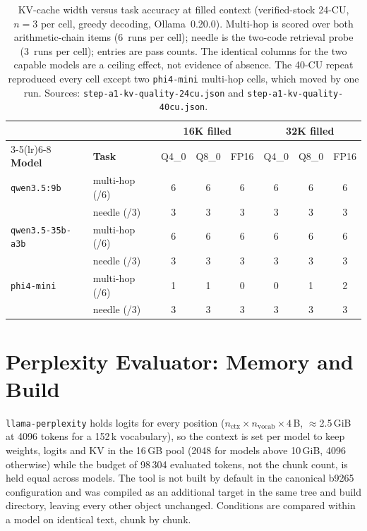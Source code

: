\documentclass[11pt,a4paper]{article}
\begin{document}
\begin{table}[h]
\centering\small
\caption{KV-cache width versus task accuracy at filled context
(verified-stock 24-CU, $n{=}3$ per cell, greedy decoding,
Ollama~0.20.0).  Multi-hop is scored over both arithmetic-chain items
(6~runs per cell); needle is the two-code retrieval probe (3~runs per
cell); entries are pass counts.  The identical columns for the two
capable models are a ceiling effect, not evidence of absence.  The
40-CU repeat reproduced every cell except two \texttt{phi4-mini}
multi-hop cells, which moved by one run.  Sources:
\texttt{step-a1-kv-quality-24cu.json} and
\texttt{step-a1-kv-quality-40cu.json}.}
\label{tab:s-kvtask}
\begin{tabular}{@{}llcccccc@{}}
\toprule
 & & \multicolumn{3}{c}{\textbf{16K filled}} & \multicolumn{3}{c}{\textbf{32K filled}} \\
\cmidrule(lr){3-5}\cmidrule(lr){6-8}
\textbf{Model} & \textbf{Task} & Q4\_0 & Q8\_0 & FP16 & Q4\_0 & Q8\_0 & FP16 \\
\midrule
\texttt{qwen3.5:9b}      & multi-hop (/6) & 6 & 6 & 6 & 6 & 6 & 6 \\
                         & needle (/3)    & 3 & 3 & 3 & 3 & 3 & 3 \\
\midrule
\texttt{qwen3.5-35b-a3b} & multi-hop (/6) & 6 & 6 & 6 & 6 & 6 & 6 \\
                         & needle (/3)    & 3 & 3 & 3 & 3 & 3 & 3 \\
\midrule
\texttt{phi4-mini}       & multi-hop (/6) & 1 & 1 & 0 & 0 & 1 & 2 \\
                         & needle (/3)    & 3 & 3 & 3 & 3 & 3 & 3 \\
\bottomrule
\end{tabular}
\end{table}

\section{Perplexity Evaluator: Memory and Build}

\texttt{llama-perplexity} holds logits for every position
($n_{\text{ctx}} \times n_{\text{vocab}} \times 4$\,B, $\approx$2.5\,GiB
at 4096 tokens for a 152\,k vocabulary), so the context is set per
model to keep weights, logits and KV in the 16\,GB pool (2048 for
models above 10\,GiB, 4096 otherwise) while the budget of 98\,304
evaluated tokens, not the chunk count, is held equal across models.
The tool is not built by default in the canonical b9265 configuration
and was compiled as an additional target in the same tree and build
directory, leaving every other object unchanged.  Conditions are
compared within a model on identical text, chunk by chunk.
\end{document}
